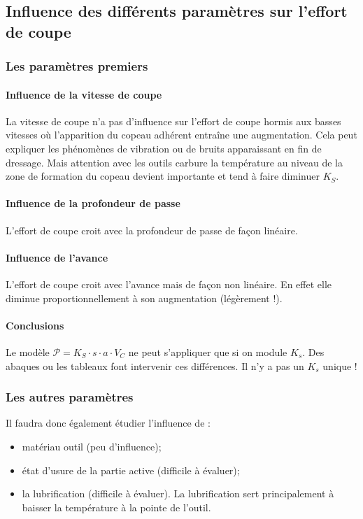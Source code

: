 \documentclass[11pt,oneside]{article}
\begin{document}
\subsection{Influence des différents paramètres sur l'effort de coupe}
\subsubsection{Les paramètres premiers}
\paragraph{Influence de la vitesse de coupe}

La vitesse de coupe n’a pas d’influence sur l’effort de coupe hormis aux basses vitesses où l’apparition du copeau adhérent entraîne une augmentation. Cela peut expliquer les phénomènes de vibration ou de bruits apparaissant en fin de dressage. Mais attention avec les outils carbure la température au niveau de la zone de formation du copeau devient importante et tend à faire diminuer  $K_S$.

\paragraph{Influence de la profondeur de passe}
L’effort de coupe croit avec la profondeur de passe de façon linéaire.

\paragraph{Influence de l'avance}
L'effort de coupe croit avec l’avance mais de façon non linéaire. En effet elle diminue proportionnellement à son augmentation (légèrement !).


\paragraph{Conclusions}
Le modèle $\mathcal{P}  = K_S \cdot s\cdot a \cdot V_C$ ne peut s'appliquer que si on module $K_s$. Des abaques ou les tableaux font intervenir ces différences. Il n'y a pas un $K_s$ unique !

\subsubsection{Les autres paramètres}
Il faudra donc également étudier l'influence de :
\begin{itemize}
\item matériau outil (peu d'influence);
\item état d'usure de la partie active (difficile à évaluer);
\item la lubrification (difficile à évaluer). La lubrification sert principalement à baisser la température à la pointe de l'outil.
\end{itemize}
\end{document}
